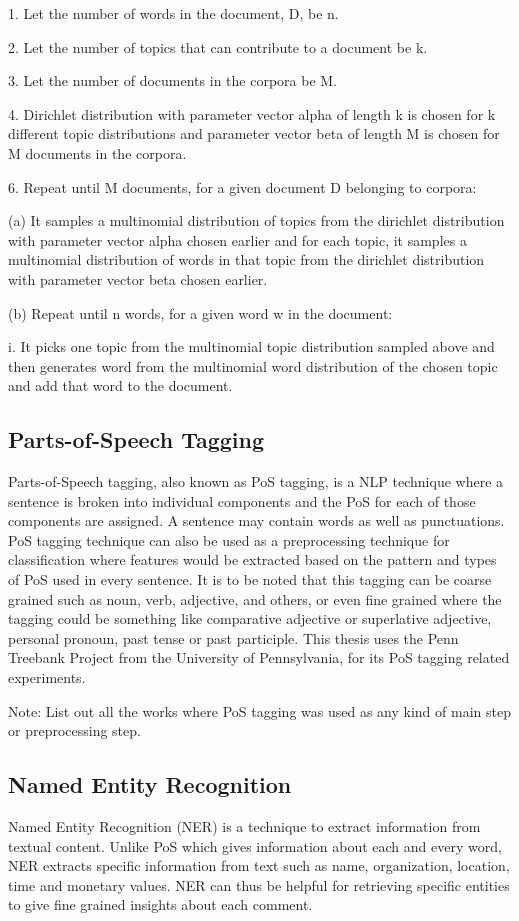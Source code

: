 \documentclass[a4paper,12pt,twoside]{report}
\begin{document}
1. Let the number of words in the document, D, be n.

2. Let the number of topics that can contribute to a document be k.

3. Let the number of documents in the corpora be M.

4. Dirichlet distribution with parameter vector alpha of length k is chosen for k different topic distributions and parameter vector beta of length M is chosen for M documents in the corpora.

6. Repeat until M documents, for a given document D belonging to corpora:

(a) It samples a multinomial distribution of topics from the dirichlet distribution with parameter vector alpha chosen earlier and for each topic, it samples a multinomial distribution of words in that topic from the dirichlet distribution with parameter vector beta chosen earlier.

(b) Repeat until n words, for a given word w in the document:

i. It picks one topic from the multinomial topic distribution sampled above and then generates word from the multinomial word distribution of the chosen topic and add that word to the document.

\subsection{Parts-of-Speech Tagging}
Parts-of-Speech tagging, also known as PoS tagging, is a NLP technique where a sentence is broken into individual components and the PoS for each of those components are assigned. A sentence may contain words as well as punctuations. PoS tagging technique can also be used as a preprocessing technique for classification where features would be extracted based on the pattern and types of PoS used in every sentence. It is to be noted that this tagging can be coarse grained such as noun, verb, adjective, and others, or even fine grained where the tagging could be something like comparative adjective or superlative adjective, personal pronoun, past tense or past participle. This thesis uses the Penn Treebank Project from the University of Pennsylvania, for its PoS tagging related experiments.

Note: List out all the works where PoS tagging was used as any kind of main step or preprocessing step. 

\subsection{Named Entity Recognition}
Named Entity Recognition (NER) is a technique to extract information from textual content. Unlike PoS which gives information about each and every word, NER extracts specific information from text such as name, organization, location, time and monetary values. NER can thus be helpful for retrieving specific entities to give fine grained insights about each comment.
\end{document}
